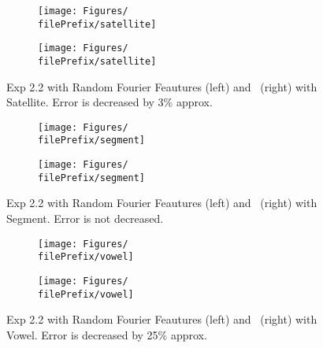\begin{figure}[H]
  \centering
  \renewcommand{\filePrefix}{\undPrefix/rff}
  \begin{subfigure}[t]{0.5\linewidth}
    \centering\captionsetup{width=.8\linewidth}\texttt{[image: Figures/\\filePrefix/satellite]}
    \label{fig:\undPrefix_satellite}
  \end{subfigure}%
  \renewcommand{\filePrefix}{\undPrefix/nys}%
  \begin{subfigure}[t]{0.5\linewidth}
    \centering\captionsetup{width=.8\linewidth}\texttt{[image: Figures/\\filePrefix/satellite]}
  \end{subfigure}
  \caption*{Exp 2.2 with Random Fourier Feautures (left) and \Nys\ (right)
   with Satellite. Error is decreased by 3\% approx.}
\end{figure}


\begin{figure}[H]
  \centering
  \renewcommand{\filePrefix}{\undPrefix/rff}
  \begin{subfigure}[t]{0.5\linewidth}
    \centering\captionsetup{width=.8\linewidth}\texttt{[image: Figures/\\filePrefix/segment]}
    \label{fig:\undPrefix_segment}
  \end{subfigure}%
  \renewcommand{\filePrefix}{\undPrefix/nys}%
  \begin{subfigure}[t]{0.5\linewidth}
    \centering\captionsetup{width=.8\linewidth}\texttt{[image: Figures/\\filePrefix/segment]}
  \end{subfigure}%
  \caption*{Exp 2.2 with Random Fourier Feautures (left) and \Nys\ (right)
   with Segment. Error is not decreased.}
\end{figure}


\begin{figure}[H]
  \centering
  \renewcommand{\filePrefix}{\undPrefix/rff}
  \begin{subfigure}[t]{0.5\linewidth}
    \centering\captionsetup{width=.8\linewidth}\texttt{[image: Figures/\\filePrefix/vowel]}
    \label{fig:\undPrefix_vowel}
  \end{subfigure}%
  \renewcommand{\filePrefix}{\undPrefix/nys}%
  \begin{subfigure}[t]{0.5\linewidth}
    \centering\captionsetup{width=.8\linewidth}\texttt{[image: Figures/\\filePrefix/vowel]}
    \label{fig:\undPrefix_vowel}
  \end{subfigure}
  \caption*{Exp 2.2 with Random Fourier Feautures (left) and \Nys\ (right)
   with Vowel. Error is decreased by 25\% approx.}
\end{figure}


